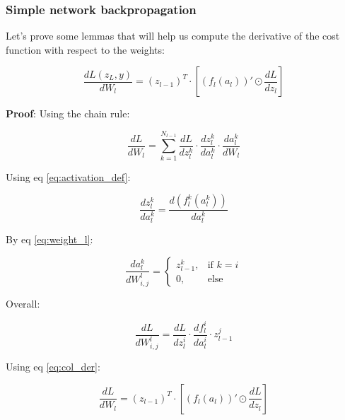 \subsubsection{Simple network backpropagation}

Let's prove some lemmas that will help us compute the derivative of the cost function with respect to the weights:

\begin{mdframed}[backgroundcolor=blue_background, linecolor=black, linewidth=2pt, frametitle=\textbf{Lemma}]
\begin{center}
\begin{equation} \label{lemma:simple_derivative}
    \frac{dL(z_L, y)}{dW_l} = (z_{l-1})^T \cdot [(f_l(a_l))' \odot \frac{dL}{dz_l}]
\end{equation}
\end{center}
\end{mdframed}

\textbf{Proof}:
Using the chain rule:

\begin{equation} \label{eq:BP-chain-rule}
    \frac{dL}{dW_l} = \sum_{k=1}^{N_{l-1}} \frac{dL}{dz_l^k} \cdot \frac{dz_l^k}{da_l^k} \cdot \frac{da_l^k}{dW_l}
\end{equation}

Using eq \ref{eq:activation_def}:

\begin{equation}
    \frac{dz_l^k}{da_l^k} = \frac{d(f_l^k(a_l^k))}{da_l^k}
\end{equation}

By eq \ref{eq:weight_l}:

\begin{equation}
    \frac{da_l^k}{dW_{i,j}^l} = \begin{cases} z_{l-1}^k, & \text{if } k=i \\ 0, & \text{else} \end{cases}
\end{equation}

Overall:

\begin{equation}
    \frac{dL}{dW_{i,j}^l} = \frac{dL}{dz_l^i} \cdot \frac{df_l^i}{da_l^i} \cdot z_{l-1}^j
\end{equation}

Using eq \ref{eq:col_der}:

\begin{equation}
    \frac{dL}{dW_l} = (z_{l-1})^T \cdot [(f_l(a_l))' \odot \frac{dL}{dz_l}]
\end{equation}


